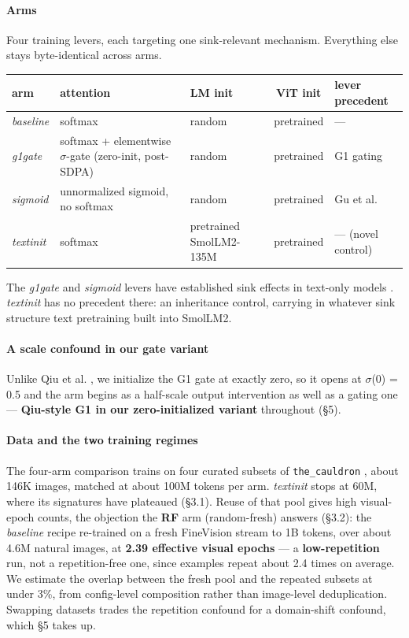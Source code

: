\documentclass{article}
\begin{document}
\paragraph{Arms} Four training levers, each targeting one sink-relevant mechanism. Everything else stays byte-identical across arms.

\begin{table}[t]
  \centering
  \small
  \begin{tabularx}{\linewidth}{lXlcl}
    \toprule
    arm & attention & LM init & ViT init & lever precedent \\
    \midrule
    \textit{baseline} & softmax & random & pretrained & --- \\
    \textit{g1gate} & softmax + elementwise $\sigma$-gate (zero-init, post-SDPA) & random & pretrained & G1 gating \cite{ref20} \\
    \textit{sigmoid} & unnormalized sigmoid, no softmax & random & pretrained & Gu et al. \cite{ref6} \\
    \textit{textinit} & softmax & pretrained SmolLM2-135M & pretrained & --- (novel control) \\
    \bottomrule
  \end{tabularx}
\end{table}

The \textit{g1gate} and \textit{sigmoid} levers have established sink effects in text-only models \cite{ref20,ref6}. \textit{textinit} has no precedent there: an inheritance control, carrying in whatever sink structure text pretraining built into SmolLM2.

\paragraph{A scale confound in our gate variant} Unlike Qiu et al. \cite{ref20}, we initialize the G1 gate at exactly zero, so it opens at $\sigma$(0) = 0.5 and the arm begins as a half-scale output intervention as well as a gating one --- \textbf{Qiu-style G1 in our zero-initialized variant} throughout (\S5).

\paragraph{Data and the two training regimes} The four-arm comparison trains on four curated subsets of \texttt{the\_cauldron} \cite{ref21}, about 146K images, matched at about 100M tokens per arm. \textit{textinit} stops at 60M, where its signatures have plateaued (\S3.1). Reuse of that pool gives high visual-epoch counts, the objection the \textbf{RF} arm (random-fresh) answers (\S3.2): the \textit{baseline} recipe re-trained on a fresh FineVision stream \cite{ref22} to 1B tokens, over about 4.6M natural images, at \textbf{2.39 effective visual epochs} --- a \textbf{low-repetition} run, not a repetition-free one, since examples repeat about 2.4 times on average. We estimate the overlap between the fresh pool and the repeated subsets at under 3\%, from config-level composition rather than image-level deduplication. Swapping datasets trades the repetition confound for a domain-shift confound, which \S5 takes up.
\end{document}
